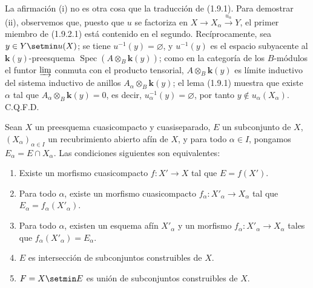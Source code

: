 La afirmación (i) no es otra cosa que la traducción de (1.9.1). Para demostrar
(ii), observemos que, puesto que $u$ se factoriza en
$X\to X_\alpha\xrightarrow{u_\alpha}Y$, el primer miembro de (1.9.2.1) está
contenido en el segundo. Recíprocamente, sea $y\in Y\setmin u(X)$; se tiene
$u^{-1}(y)=\varnothing$, y $u^{-1}(y)$ es el espacio subyacente al
$\boldsymbol{k}(y)$-preesquema $\operatorname{Spec}(A\otimes_B\boldsymbol{k}(y))$; como en la
categoría de los $B$-módulos el funtor $\varinjlim$ conmuta con el producto
tensorial, $A\otimes_B\boldsymbol{k}(y)$ es límite inductivo del sistema inductivo de anillos
$A_\alpha\otimes_B\boldsymbol{k}(y)$; el lema (1.9.1) muestra que existe $\alpha$ tal
que $A_\alpha\otimes_B\boldsymbol{k}(y)=0$, es decir,
$u_\alpha^{-1}(y)=\varnothing$, por tanto $y\notin u_\alpha(X_\alpha)$. C.Q.F.D.

\begin{proposition}[1.9.3]
\label{IV.1.9.3-fr}
Sean $X$ un preesquema cuasicompacto y cuasiseparado, $E$ un subconjunto de $X$,
$(X_\alpha)_{\alpha\in I}$ un recubrimiento abierto afín de $X$, y para
todo $\alpha\in I$, pongamos $E_\alpha=E\cap X_\alpha$. Las condiciones
siguientes son equivalentes:
\begin{enumerate}
  \item[\textup{a)}] Existe un morfismo cuasicompacto $f:X'\to X$ tal que
  $E=f(X')$.
  \item[\textup{a$'$)}] Para todo $\alpha$, existe un morfismo cuasicompacto
  $f_\alpha:X'_\alpha\to X_\alpha$ tal que
  $E_\alpha=f_\alpha(X'_\alpha)$.
  \item[\textup{a$''$)}] Para todo $\alpha$, existen un esquema afín $X'_\alpha$
  y un morfismo $f_\alpha:X'_\alpha\to X_\alpha$ tales que
  $f_\alpha(X'_\alpha)=E_\alpha$.
  \item[\textup{b)}] $E$ es intersección de subconjuntos construibles de $X$.
  \item[\textup{b$'$)}] $F=X\setmin E$ es unión de subconjuntos construibles de $X$.
\end{enumerate}
\end{proposition}


